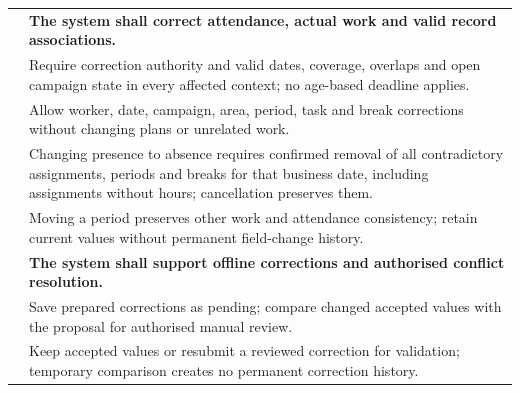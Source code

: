 {\begin{longtable}{L{0.18}L{0.82}}
\midrule
{}
\label{fr:036}\textbf{} & \textbf{The system shall correct attendance, actual work and valid record associations.}\\*
\label{ac:036:a} & Require correction authority and valid dates, coverage, overlaps and open campaign state in every affected context; no age-based deadline applies.\\
\label{ac:036:b} & Allow worker, date, campaign, area, period, task and break corrections without changing plans or unrelated work.\\
\label{ac:036:c} & Changing presence to absence requires confirmed removal of all contradictory assignments, periods and breaks for that business date, including assignments without hours; cancellation preserves them.\\
\label{ac:036:d} & Moving a period preserves other work and attendance consistency; retain current values without permanent field-change history.\\
\midrule
{}
\label{fr:037}\textbf{} & \textbf{The system shall support offline corrections and authorised conflict resolution.}\\*
\label{ac:037:a} & Save prepared corrections as pending; compare changed accepted values with the proposal for authorised manual review.\\
\label{ac:037:b} & Keep accepted values or resubmit a reviewed correction for validation; temporary comparison creates no permanent correction history.\\
\end{longtable}
}
